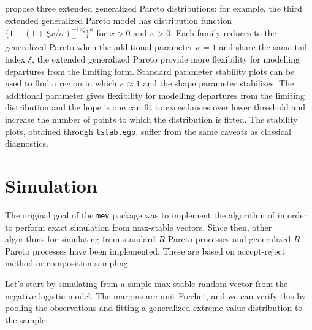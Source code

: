 \documentclass[]{book}
\newenvironment{Shaded}{\begin{snugshade}}{\end{snugshade}}
\newcommand{\DataTypeTok}[1]{\textcolor[rgb]{0.13,0.29,0.53}{#1}}
\newcommand{\DecValTok}[1]{\textcolor[rgb]{0.00,0.00,0.81}{#1}}
\newcommand{\FloatTok}[1]{\textcolor[rgb]{0.00,0.00,0.81}{#1}}
\newcommand{\KeywordTok}[1]{\textcolor[rgb]{0.13,0.29,0.53}{\textbf{#1}}}
\newcommand{\NormalTok}[1]{#1}
\newcommand{\OperatorTok}[1]{\textcolor[rgb]{0.81,0.36,0.00}{\textbf{#1}}}
\newcommand{\OtherTok}[1]{\textcolor[rgb]{0.56,0.35,0.01}{#1}}
\newcommand{\StringTok}[1]{\textcolor[rgb]{0.31,0.60,0.02}{#1}}
\begin{document}
\citet{Papastathopoulos:2013} propose three extended generalized Pareto distributions: for example, the third extended generalized Pareto model has distribution function \(\{1-(1+\xi x/\sigma)^{-1/\xi}_{+}\}^{\kappa}\) for \(x >0\) and \(\kappa > 0\). Each family reduces to the generalized Pareto when the additional parameter \(\kappa=1\) and share the same tail index \(\xi\), the extended generalized Pareto provide more flexibility for modelling departures from the limiting form. Standard parameter stability plots can be used to find a region in which \(\kappa \approx 1\) and the shape parameter stabilizes. The additional parameter gives flexibility for modelling departures from the limiting distribution and the hope is one can fit to exceedances over lower threshold and increase the number of points to which the distribution is fitted. The stability plots, obtained through \texttt{tstab.egp}, suffer from the same caveats as classical diagnostics.

\hypertarget{simulation}{%
\chapter{Simulation}\label{simulation}}

The original goal of the \texttt{mev} package was to implement the algorithm of \citet{Dombry:2016} in order to perform exact simulation from max-stable vectors. Since then, other algorithms for simulating from standard \(R\)-Pareto processes and generalized \(R\)-Pareto processes have been implemented. These are based on accept-reject method or composition sampling.

Let's start by simulating from a simple max-stable random vector from the negative logistic model. The margins are unit Frechet, and we can verify this by pooling the observations and fitting a generalized extreme value distribution to the sample.

\begin{Shaded}
\end{Shaded}
\end{document}
